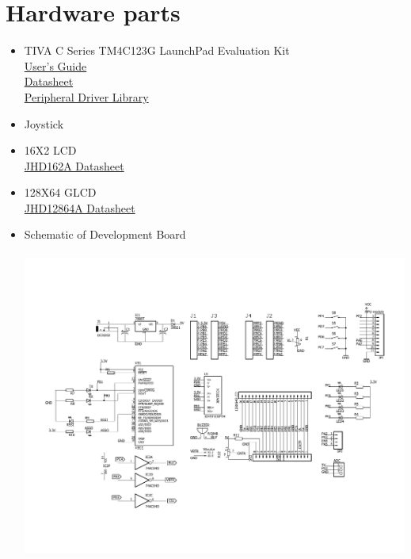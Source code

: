 \documentclass[a4paper,12pt,oneside]{book}
\begin{document}
\section{Hardware parts}
\begin{itemize}
  \item TIVA C Series TM4C123G LaunchPad Evaluation Kit\\
  \href{http://www.ti.com/lit/ug/spmu296/spmu296.pdf}{User's Guide}\\
  \href{http://www.ti.com.cn/cn/lit/ds/symlink/tm4c123gh6pm.pdf}{Datasheet}\\
  \href{http://www.ti.com/lit/ug/spmu298a/spmu298a.pdf}{Peripheral Driver Library}
  \item Joystick
  \item 16X2 LCD \\
  \href{http://www.agspecinfo.com/pdfs/J/JHD162A.PDF}{JHD162A Datasheet}\\
  \item 128X64 GLCD\\
  \href{http://www.agspecinfo.com/pdfs/J/JHD12864.PDF}{JHD12864A Datasheet}\\
  \item Schematic of Development Board\\~\\
  \includegraphics[scale = 0.4]{Gameconsol.pdf}
\end{itemize}

\end{document}
